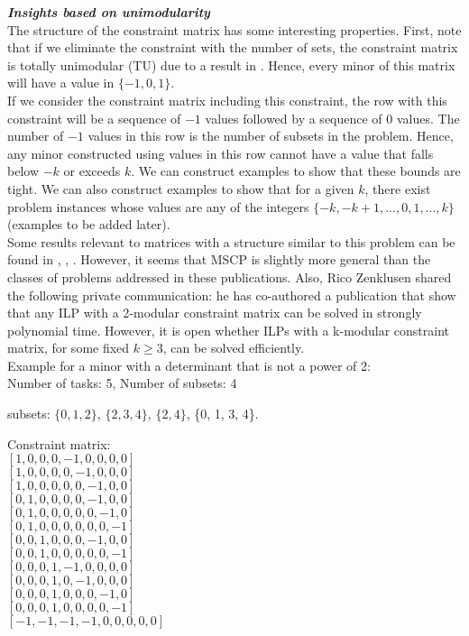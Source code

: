 \documentclass[12pt]{article}
\newcommand{\subheading}[1]{\emph{\textbf{#1}}}
\begin{document}
\subheading{Insights based on unimodularity}\\

The structure of the constraint matrix has some interesting properties. First, note that if we eliminate the constraint with the number of sets, the constraint matrix is totally unimodular (TU) due to a result in \cite{nemhauser1988integer}. Hence, every minor of this matrix will have a value in $\{-1, 0, 1\}$.\\

If we consider the constraint matrix including this constraint, the row with this constraint will be a sequence of $-1$ values followed by a sequence of $0$ values. The number of $-1$ values in this row is the number of subsets in the problem. Hence, any minor constructed using values in this row cannot have a value that falls below $-k$ or exceeds $k$. We can construct examples to show that these bounds are tight. We can also construct examples to show that for a given $k$, there exist problem instances whose values are any of the integers $\{-k, -k+1, ..., 0, 1, ..., k\}$ (examples to be added later).\\

Some results relevant to matrices with a structure similar to this problem can be found in \cite{gribanov2013integer}, \cite{gribanov2015integer}, \cite{kotnyek2002generalization}. However, it seems that MSCP is slightly more general than the classes of problems addressed in these publications. Also, Rico Zenklusen shared the following private communication: he has co-authored a publication that show that  any ILP with a 2-modular constraint matrix can be solved in strongly polynomial time. However, it is open whether ILPs with a k-modular constraint matrix, for some fixed $k \geq 3$, can be solved efficiently.\\

Example for a minor with a determinant that is not a power of 2:\\

Number of tasks: 5, Number of subsets: 4

subsets: $\{0, 1, 2\}$, $\{2, 3, 4\}$, $\{2, 4\}$, \{0, 1, 3, 4\}.

Constraint matrix:\\

$[1, 0, 0, 0, -1, 0, 0, 0, 0]$\\
$[1, 0, 0, 0, 0, -1, 0, 0, 0]$\\
$[1, 0, 0, 0, 0, 0, -1, 0, 0]$\\
$[0, 1, 0, 0, 0, 0, -1, 0, 0]$\\
$[0, 1, 0, 0, 0, 0, 0, -1, 0]$\\
$[0, 1, 0, 0, 0, 0, 0, 0, -1]$\\
$[0, 0, 1, 0, 0, 0, -1, 0, 0]$\\
$[0, 0, 1, 0, 0, 0, 0, 0, -1]$\\
$[0, 0, 0, 1, -1, 0, 0, 0, 0]$\\
$[0, 0, 0, 1, 0, -1, 0, 0, 0]$\\
$[0, 0, 0, 1, 0, 0, 0, -1, 0]$\\
$[0, 0, 0, 1, 0, 0, 0, 0, -1]$\\
$[-1, -1, -1, -1, 0, 0, 0, 0, 0]$\\
\end{document}
